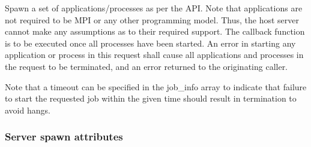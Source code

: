
\optattrend

\descr

Spawn a set of applications/processes as per the  API.
Note that applications are not required to be \ac{MPI} or any other programming model.
Thus, the host server cannot make any assumptions as to their required support.
The callback function is to be executed once all processes have been started.
An error in starting any application or process in this request shall cause all applications and processes in the request to be terminated, and an error returned to the originating caller.

Note that a timeout can be specified in the job_info array to indicate that failure to start the requested job within the given time should result in termination to avoid hangs.

\subsubsection{Server spawn attributes}

%

%




